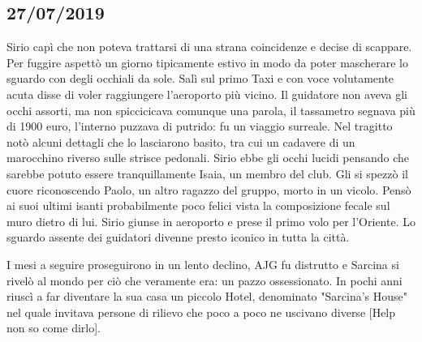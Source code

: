 \subsection*{27/07/2019}
Sirio capì che non poteva trattarsi di una strana coincidenze e decise di scappare. Per fuggire aspettò un giorno tipicamente estivo in modo da poter mascherare lo sguardo con degli occhiali da sole. Salì sul primo Taxi e con voce volutamente acuta disse di voler raggiungere l'aeroporto più vicino. Il guidatore non aveva gli occhi assorti, ma non spiccicicava comunque una parola, il tassametro segnava più di 1900 euro, l'interno puzzava di putrido: fu un viaggio surreale. 
Nel tragitto notò alcuni dettagli che lo lasciarono basito, tra cui un cadavere di un marocchino riverso sulle strisce pedonali. Sirio ebbe gli occhi lucidi pensando che sarebbe potuto essere tranquillamente Isaia, un membro del club. Gli si spezzò il cuore riconoscendo Paolo, un altro ragazzo del gruppo, morto in un vicolo. Pensò ai suoi ultimi isanti probabilmente poco felici vista la composizione fecale sul muro dietro di lui.
Sirio giunse in aeroporto e prese il primo volo per l'Oriente. Lo sguardo assente dei guidatori divenne presto iconico in tutta la città.


I mesi a seguire proseguirono in un lento declino, AJG fu distrutto e Sarcina si rivelò al mondo per ciò che veramente era: un pazzo ossessionato. In pochi anni riuscì a far diventare la sua casa un piccolo Hotel, denominato "Sarcina's House" nel quale invitava persone di rilievo che poco a poco ne uscivano diverse [Help non so come dirlo]. 
